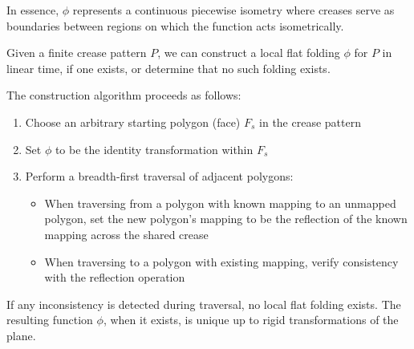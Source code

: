 In essence, $\phi$ represents a continuous piecewise isometry where creases serve as boundaries between regions on which the function acts isometrically.

Given a finite crease pattern $P$, we can construct a local flat folding $\phi$ for $P$ in linear time, if one exists, or determine that no such folding exists.

The construction algorithm proceeds as follows:

\begin{enumerate}
\item Choose an arbitrary starting polygon (face) $F_s$ in the crease pattern
\item Set $\phi$ to be the identity transformation within $F_s$
\item Perform a breadth-first traversal of adjacent polygons:
\begin{itemize}
\item When traversing from a polygon with known mapping to an unmapped polygon, set the new polygon's mapping to be the reflection of the known mapping across the shared crease
\item When traversing to a polygon with existing mapping, verify consistency with the reflection operation
\end{itemize}
\end{enumerate}

If any inconsistency is detected during traversal, no local flat folding exists. The resulting function $\phi$, when it exists, is unique up to rigid transformations of the plane.


